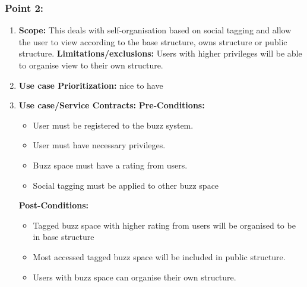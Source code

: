 \documentclass[11pt]{article}
\begin{document}
\subsubsection{Point 2:} 
\begin{enumerate}
\item 
\textbf{Scope:}
This deals with self-organisation based on social tagging and allow the user to view according to the base structure, owns structure or public structure.
\newline
\textbf{Limitations/exclusions:} 
Users with higher privileges will be able to organise view to their own structure.
\item 
\textbf{Use case Prioritization:} nice to have

\item 
\textbf{Use case/Service Contracts:} 
\newline
\textbf{Pre-Conditions: }
\begin{itemize}
\item User must be registered to the buzz system.
\item User must have necessary privileges.
\item Buzz space must have a rating from users.
\item Social tagging must be applied to other buzz space
\end{itemize}
 

\textbf{Post-Conditions: }
\begin{itemize}
\item Tagged buzz space with higher rating from users will be organised to be in base structure
\item Most accessed tagged buzz space will be included in public structure.
\item Users with buzz space can organise their own structure.
\end{itemize}
\end{enumerate}
\end{document}
